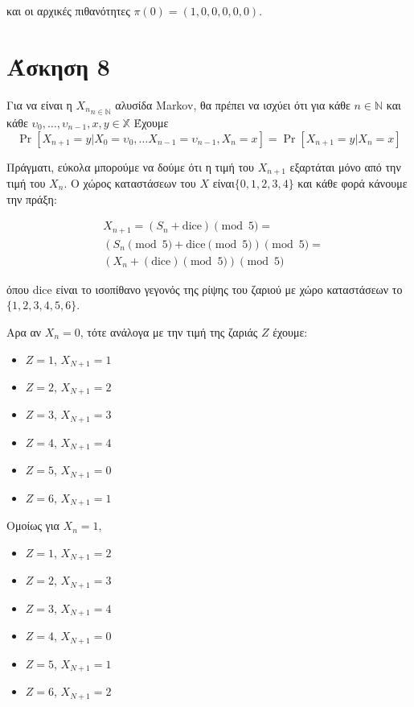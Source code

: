 \documentclass[11pt,a4paper]{article}
\newcommand{\english}[1]{\foreignlanguage{english}{{#1}}}
\begin{document}
και οι αρχικές πιθανότητες $π(0) = (1, 0, 0, 0, 0, 0)$.

\section*{Άσκηση 8}

Για να είναι η ${X_n}_{n \in \mathbb{N}}$ αλυσίδα \english{Markov}, θα πρέπει να ισχύει ότι για κάθε $n \in \mathbb{N}$ και κάθε $υ_0, \dots, υ_{n-1}, x, y \in \mathbb{X}$ Έχουμε
\begin{equation*}
    \Pr{[X_{n+1} = y | X_0 = υ_0, \dots X_{n-1} = υ_{n-1}, X_n = x]} = \Pr{[X_{n+1} = y | X_n = x]}
\end{equation*}

Πράγματι, εύκολα μπορούμε να δούμε ότι η τιμή του $X_{n+1}$ εξαρτάται μόνο από την τιμή του $X_n$. Ο χώρος καταστάσεων του $X$ είναι$\{0, 1, 2, 3, 4\}$ και κάθε φορά κάνουμε την πράξη: 
\begin{otherlanguage}{english}
    \begin{align*}
         & X_{n+1}  = (S_{n} + \text{dice})\pmod 5 =      \\
         & (S_{n}\pmod 5 + \text{dice} \pmod 5) \pmod 5 = \\
         & (X_n + (\text{dice}) \pmod 5) \pmod 5
    \end{align*}
\end{otherlanguage}


όπου \english{dice} είναι το ισοπίθανο γεγονός της ρίψης του ζαριού με χώρο καταστάσεων το $\{1, 2, 3, 4, 5, 6\}$.

Αρα αν $X_n = 0$, τότε ανάλογα με την τιμή της ζαριάς $Z$ έχουμε:
\begin{itemize}
    \item $Z=1$, $X_{N+1} = 1$
    \item $Z=2$, $X_{N+1} = 2$
    \item $Z=3$, $X_{N+1} = 3$
    \item $Z=4$, $X_{N+1} = 4$
    \item $Z=5$, $X_{N+1} = 0$
    \item $Z=6$, $X_{N+1} = 1$
\end{itemize}

Ομοίως για $X_n = 1$,
\begin{itemize}
    \item $Z=1$, $X_{N+1} = 2$
    \item $Z=2$, $X_{N+1} = 3$
    \item $Z=3$, $X_{N+1} = 4$
    \item $Z=4$, $X_{N+1} = 0$
    \item $Z=5$, $X_{N+1} = 1$
    \item $Z=6$, $X_{N+1} = 2$
\end{itemize}
\end{document}
